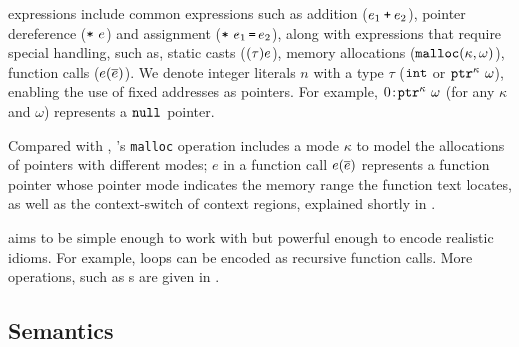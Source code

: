 \lang expressions include common expressions such as addition ($e_1 \mathbin{\texttt{+}} e_2$), 
pointer dereference ($\texttt{*}~{e}$) and assignment ($\texttt{*}~{e_1}\,\texttt{=}\, {e_2}$),
along with expressions that require special handling, such as,
 static casts ($\mathtt{(}{\tau}\mathtt{)}{e}$),
memory allocations ($\mathtt{malloc}({\kappa},{\omega})$), 
function calls (${e}({\overline{e}})$).
We denote integer literals $n$ with a type $\tau$ (\ie $\mathtt{int}$ or $\mathtt{ptr}^{\kappa}~{\omega}$), enabling the use of fixed addresses as pointers.
For example, ${0}\!:\!{\mathtt{ptr}^{\kappa}~{\omega}}$ (for any $\kappa$ and $\omega$) represents a $\mathtt{null}$ pointer.

Compared with \checkedc, \lang's \texttt{malloc} operation includes a mode $\kappa$ to model the allocations of pointers with different modes; $e$ in a function call ${e}({\overline{e}})$ represents a function pointer whose pointer mode indicates the memory range the function text locates, as well as the context-switch of context regions, explained shortly in .

\lang{} aims to be simple enough to work with but powerful enough to
encode realistic \systemname idioms. For example,
loops can be encoded as recursive function calls. 
More operations, such as s are given in .

\subsection{Semantics}\label{sec:semantics}

